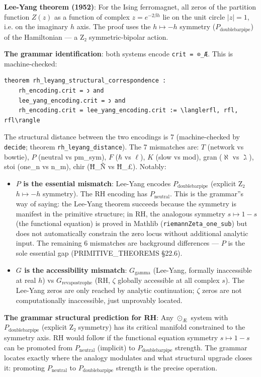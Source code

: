 \documentclass[12pt,a4paper]{article}
\newcommand{\pilcrow}{\S}
\begin{document}
\textbf{Lee-Yang theorem (1952)}: For the Ising ferromagnet, all zeros of the partition function $Z(z)$ as a function of complex $z = e^{-2\beta h}$ lie on the unit circle $|z| = 1$, i.e. on the imaginary $h$ axis. The proof uses the $h \mapsto -h$ symmetry ($P_{\text{doublebarpipe}}$) of the Hamiltonian --- a Z₂ symmetric-bipolar action.

\textbf{The grammar identification}: both systems encode \texttt{crit = ⊙\_Æ}. This is machine-checked:

\begin{lstlisting}[language=lean]
theorem rh_leyang_structural_correspondence :
    rh_encoding.crit = 𐑮 and
    lee_yang_encoding.crit = 𐑮 and
    rh_encoding.crit = lee_yang_encoding.crit := \langlerfl, rfl, rfl\rangle
\end{lstlisting}

The structural distance between the two encodings is 7 (machine-checked by \texttt{decide}; theorem \texttt{rh\_leyang\_distance}). The 7 mismatches are: $T$ (network vs bowtie), $P$ (neutral vs pm\_sym), $F$ ($\hbar$ vs $\ell$), $K$ (slow vs mod), gran ($\aleph$ vs $\gimel$), stoi (one\_n vs n\_m), chir (Ħ\_Ñ vs Ħ\_£). Notably:

\begin{itemize}
    \item \textbf{$P$ is the essential mismatch}: Lee-Yang encodes $P_{\text{doublebarpipe}}$ (explicit Z₂ $h \mapsto -h$ symmetry). The RH encoding has $P_\text{neutral}$. This is the grammar''s way of saying: the Lee-Yang theorem succeeds because the symmetry is manifest in the primitive structure; in RH, the analogous symmetry $s \mapsto 1-s$ (the functional equation) is proved in Mathlib (\texttt{riemannZeta\_one\_sub}) but does not automatically constrain the zero locus without additional analytic input. The remaining 6 mismatches are background differences --- $P$ is the sole essential gap (PRIMITIVE\_THEOREMS \pilcrow{}22.6).
    \item \textbf{$G$ is the accessibility mismatch}: $G_{\text{gamma}}$ (Lee-Yang, formally inaccessible at real $h$) vs $G_{\text{revapostrophe}}$ (RH, $\zeta$ globally accessible at all complex $s$). The Lee-Yang zeros are only reached by analytic continuation; $\zeta$ zeros are not computationally inaccessible, just unprovably located.
\end{itemize}

\textbf{The grammar structural prediction for RH}: Any $\odot_{\text{Æ}}$ system with $P_{\text{doublebarpipe}}$ (explicit Z₂ symmetry) has its critical manifold constrained to the symmetry axis. RH would follow if the functional equation symmetry $s \mapsto 1-s$ can be promoted from $P_\text{neutral}$ (implicit) to $P_{\text{doublebarpipe}}$ strength. The grammar locates exactly where the analogy modulates and what structural upgrade closes it: promoting $P_\text{neutral}$ to $P_{\text{doublebarpipe}}$ strength is the precise operation.
\end{document}
